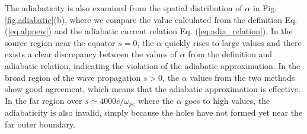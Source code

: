 The adiabaticity is also examined from the spatial distribution of $\alpha$ in Fig. \ref{fig.adiabatic}(b), where we compare the value calculated from the definition Eq. (\ref{eq.alpnew}) and the adiabatic current relation Eq. (\ref{eq.adia_relation}). 
In the source region near the equator $s=0$, the $\alpha$  quickly rises to large values and there exists a clear discrepancy between the values of $\alpha$ from the definition and adiabatic relation, indicating  the violation of the adiabatic approximation.
In the broad region of the wave propagation $s>0$,  the $\alpha$ values  from the two methods show good agreement,  which means that the adiabatic approximation is effective.
In the far region over $s\simeq4000c/\omega_{pe}$ where the  $\alpha$  goes to high values, the adiabaticity is also invalid, simply because the holes have not formed yet near the far outer boundary. 
